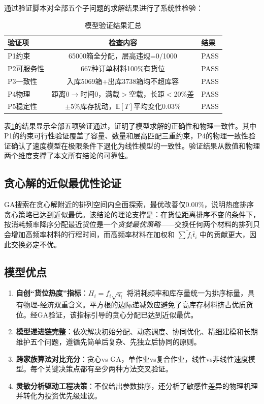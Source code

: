 \documentclass[a4paper]{cumcmthesis}
\newcommand{\headcol}{\rowcolor{tableheadcolor}}
\newcommand{\ftilde}{\tilde{f}}
\begin{document}
通过验证脚本对全部五个子问题的求解结果进行了系统性检验：

\begin{table}[htbp]
\centering\small
\caption{模型验证结果汇总}
\label{tab:verify}
\begin{tabular}{lcl}
\toprule
\headcol 验证项 & 检查内容 & 结果 \\
\midrule
[V-OPT-1] P1约束 & 65000箱全分配，层高违规=0/1000 & PASS \\
[V-OPT-1] P2可服务性 & 667种订单材料100\%有货位 & PASS \\
[V-OPT-3] P3一致性 & 入库5069箱+出库3738箱均不超库容 & PASS \\
[V-ODE-1] P4物理 & 距离0$\to$时间0，满载$>$空载，长距$<$20\%差 & PASS \\
[V-OPT-3] P5稳定性 & $\pm$5\%库存扰动，$\mathbb{E}[T]$平均变化0.03\% & PASS \\
\bottomrule
\end{tabular}
\end{table}

表\ref{tab:verify}的结果显示全部五项验证通过，证明了模型求解的正确性和物理一致性。其中P1的约束可行性验证覆盖了容量、数量和层高匹配三重约束，P4的物理一致性验证确认了速度模型在极限条件下退化为线性模型的一致性。验证结果从数值和物理两个维度支撑了本文所有结论的可靠性。

\subsection{贪心解的近似最优性论证}

GA搜索在贪心解附近的排列空间内全面探索，最优改善仅0.00\%，说明热度排序贪心策略已达到近似最优。该结论的理论支撑是：在货位距离排序不变的条件下，按消耗频率降序分配最近货位是一个\emph{贪婪最优策略}——交换任何两个材料的排列只会增加高频率材料的行程时间，而高频率材料在加权和 $\sum\ftilde_i\bar{t}_i$ 中的贡献更大，因此交换必定不优。

\subsection{模型优点}
\begin{enumerate}
\item \textbf{自创``货位热度''指标}：$H_i=f_i\sqrt{q_i}$ 将消耗频率和库存量统一为排序标量，具有物理-经济双重含义。平方根的边际递减效应避免了高库存材料挤占优质货位。经GA验证，该指标引导的贪心分配已达到近似最优。
\item \textbf{模型递进链完整}：依次解决初始分配、动态调度、协同优化、精细建模和长期维护五个问题，遵循先简单后复杂、先独立后协同的原则。
\item \textbf{跨家族算法对比充分}：贪心vs GA，单作业vs复合作业，线性vs非线性速度模型。每个关键决策点都有至少两种方法交叉验证。
\item \textbf{灵敏分析驱动工程决策}：不仅给出参数排序，还分析了敏感性差异的物理机理并转化为投资优先级建议。
\end{enumerate}
\end{document}
